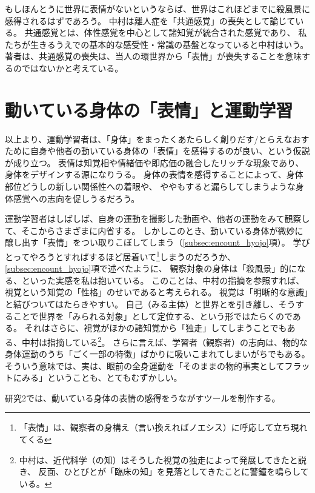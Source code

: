 もしほんとうに世界に表情がないというならば、世界はこれほどまでに殺風景に感得されるはずであろう。
中村\cite{nakamura:1979}は離人症を「共通感覚」の喪失として論じている。
共通感覚とは、体性感覚を中心として諸知覚が統合された感覚であり、
私たちが生きるうえでの基本的な感受性・常識の基盤となっていると中村はいう。
著者は、共通感覚の喪失は、当人の環世界から「表情」が喪失することを意味するのではないかと考えている。

\section{動いている身体の「表情」と運動学習}
\label{sec:hyojo_and_motorlearning}
以上より、運動学習者は、「身体」をまったくあたらしく創りだす/とらえなおすために自身や他者の動いている身体の「表情」を感得するのが良い、という仮説が成り立つ。
表情は知覚相や情緒価や即応価の融合したリッチな現象であり、身体をデザインする源になりうる。
身体の表情を感得することによって、身体部位どうしの新しい関係性への着眼や、
ややもすると漏らしてしまうような身体感覚への志向を促しうるだろう。

運動学習者はしばしば、自身の運動を撮影した動画や、他者の運動をみて観察して、そこからさまざまに内省する。
しかしこのとき、動いている身体が微妙に醸し出す「表情」をつい取りこぼしてしまう（\ref{subsec:encount_hyojo}項）。
学びとってやろうとすればするほど居着いて\footnote{
「表情」は、観察者の身構え（言い換えればノエシス\cite{kimura:2005}）に呼応して立ち現れてくる  
}しまうのだろうか、\ref{subsec:encount_hyojo}項で述べたように、
観察対象の身体は「殺風景」的になる、といった実感を私は抱いている。
このことは、中村\cite{nakamura:1979}の指摘を参照すれば、
視覚という知覚の「性格」のせいであると考えられる。
視覚は「明晰的な意識」と結びついてはたらきやすい。
自己（みる主体）と世界とを引き離し、そうすることで世界を「みられる対象」として定位する、という形ではたらくのである。
それはさらに、視覚がほかの諸知覚から「独走」してしまうことでもある、中村は指摘している\footnote{
  中村は、近代科学（の知）はそうした視覚の独走によって発展してきたと説き、
  反面、ひとびとが「臨床の知」\cite{nakamura:1992}を見落としてきたことに警鐘を鳴らしている。
}。
さらに言えば、学習者（観察者）の志向は、物的な身体運動のうち「ごく一部の特徴」ばかりに吸いこまれてしまいがちでもある。
そういう意味では、実は、眼前の全身運動を「そのままの物的事実としてフラットにみる」ということも、とてもむずかしい。

研究2では、動いている身体の表情の感得をうながすツールを制作する。

